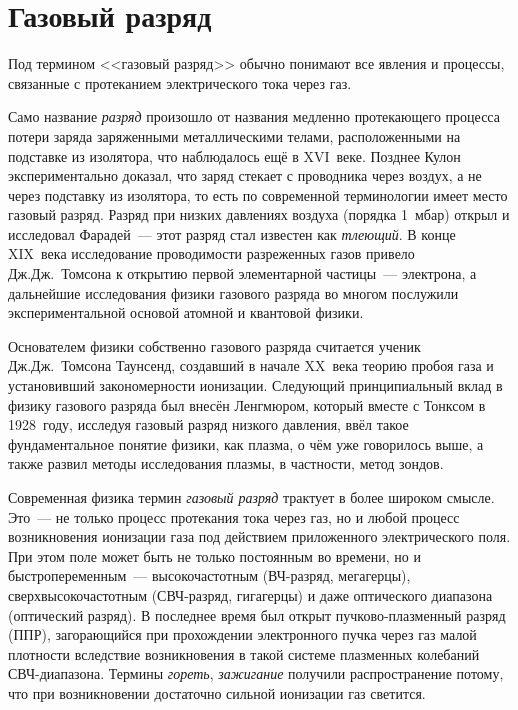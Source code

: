 \section{Газовый разряд}

Под термином <<газовый разряд>> обычно понимают все явления и процессы, связанные с протеканием электрического тока
через газ.

Само название {\em разряд} произошло от названия медленно протекающего процесса потери заряда заряженными металлическими
телами, расположенными на подставке из изолятора, что наблюдалось ещё в XVI~веке. Позднее Кулон экспериментально
доказал, что заряд стекает с проводника через воздух, а не через подставку из изолятора, то есть по современной
терминологии имеет место газовый разряд. Разряд при низких давлениях воздуха (порядка 1~мбар) открыл и исследовал
Фарадей~--- этот разряд стал известен как \textit{тлеющий}. В конце XIX~века исследование проводимости разреженных газов
привело Дж.Дж.~Томсона к открытию первой элементарной частицы~--- электрона, а дальнейшие исследования физики газового
разряда во многом послужили экспериментальной основой атомной и квантовой физики.

Основателем физики собственно газового разряда считается ученик Дж.Дж.~Томсона Таунсенд, создавший в начале XX~века
теорию пробоя газа и установивший закономерности ионизации. Следующий принципиальный вклад в физику газового разряда был
внесён Ленгмюром, который вместе с Тонксом в 1928~году, исследуя газовый разряд низкого давления, ввёл такое
фундаментальное понятие физики, как плазма, о чём уже говорилось выше, а также развил методы исследования плазмы, в
частности, метод зондов.

Современная физика термин {\em газовый разряд} трактует в более широком смысле. Это~--- не только процесс протекания
тока через газ, но и любой процесс возникновения ионизации газа под действием приложенного электрического поля. При этом
поле может быть не только постоянным во времени, но и быстропеременным~--- высокочастотным (ВЧ-разряд, мегагерцы),
сверхвысокочастотным (СВЧ-разряд, гигагерцы) и даже оптического диапазона (оптический разряд). В последнее время был
открыт пучково-плазменный разряд (ППР), загорающийся при прохождении электронного пучка через газ малой плотности
вследствие возникновения в такой системе плазменных колебаний СВЧ-диапазона. Термины {\em гореть}, {\em зажигание}
получили распространение потому, что при возникновении достаточно сильной ионизации газ светится.

